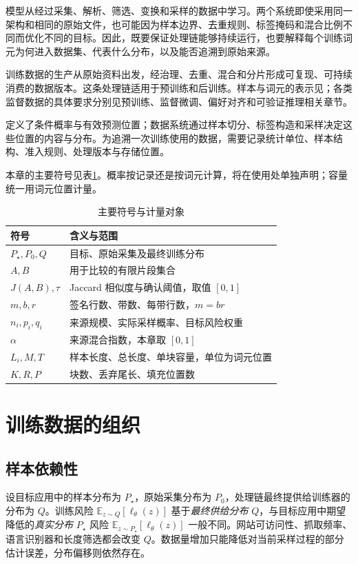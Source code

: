 \documentclass[../textbook.tex]{subfiles}
\begin{document}
\fi
{}

模型从经过采集、解析、筛选、变换和采样的数据中学习。两个系统即使采用同一架构和相同的原始文件，也可能因为样本边界、去重规则、标签掩码和混合比例不同而优化不同的目标。因此，既要保证处理链能够持续运行，也要解释每个训练词元为何进入数据集、代表什么分布，以及能否追溯到原始来源。

训练数据的生产从原始资料出发，经治理、去重、混合和分片形成可复现、可持续消费的数据版本。这条处理链适用于预训练和后训练。样本与词元的表示见；各类监督数据的具体要求分别见预训练、监督微调、偏好对齐和可验证推理相关章节。

定义了条件概率与有效预测位置；数据系统通过样本切分、标签构造和采样决定这些位置的内容与分布。为追溯一次训练使用的数据，需要记录统计单位、样本结构、准入规则、处理版本与存储位置。

本章的主要符号见表\ref{tab:data-engineering-symbols}。概率按记录还是按词元计算，将在使用处单独声明；容量统一用词元位置计量。
\begin{table}[htbp]
\centering
\caption{主要符号与计量对象}
\label{tab:data-engineering-symbols}
\begin{tabular}{ll}
\toprule
符号 & 含义与范围\\
\midrule
$P_\star,P_0,Q$ & 目标、原始采集及最终训练分布\\
$A,B$ & 用于比较的有限片段集合\\
$J(A,B),\tau$ & Jaccard 相似度与确认阈值，取值 $[0,1]$\\
$m,b,r$ & 签名行数、带数、每带行数，$m=br$\\
$n_i,p_i,q_i$ & 来源规模、实际采样概率、目标风险权重\\
$\alpha$ & 来源混合指数，本章取 $[0,1]$\\
$L_i,M,T$ & 样本长度、总长度、单块容量，单位为词元位置\\
$K,R,P$ & 块数、丢弃尾长、填充位置数\\
\bottomrule
\end{tabular}
\end{table}

\section{训练数据的组织}

\subsection{样本依赖性}
设目标应用中的样本分布为 $P_\star$，原始采集分布为 $P_0$，处理链最终提供给训练器的分布为 $Q$。训练风险 $\mathbb E_{z\sim Q}[\ell_\theta(z)]$ 基于\emph{最终供给分布} $Q$，与目标应用中期望降低的\emph{真实分布} $P_\star$ 风险 $\mathbb E_{z\sim P_\star}[\ell_\theta(z)]$ 一般不同。网站可访问性、抓取频率、语言识别器和长度筛选都会改变 $Q$。数据量增加只能降低对当前采样过程的部分估计误差，分布偏移则依然存在。
\end{document}
